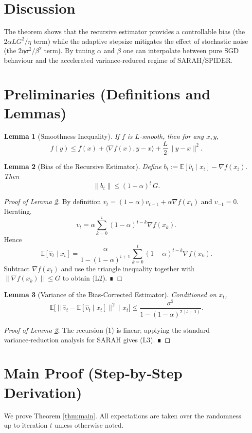 \documentclass{article}
\newtheorem{lemma}{Lemma}
\newcommand{\E}{\mathbb{E}}
\begin{document}
\section*{Discussion}
The theorem shows that the recursive estimator provides a controllable bias (the $2\alpha LG^{2}/\eta$ term) while the adaptive stepsize mitigates the effect of stochastic noise (the $2\eta\sigma^{2}/\beta^{2}$ term). By tuning $\alpha$ and $\beta$ one can interpolate between pure SGD behaviour and the accelerated variance‑reduced regime of SARAH/SPIDER.

\newpage
\section*{Preliminaries (Definitions and Lemmas)}
\begin{lemma}[Smoothness Inequality]\label{lem:smooth}
If $f$ is $L$‑smooth, then for any $x,y$,
\[
f(y)\le f(x)+\langle\nabla f(x),y-x\rangle+\frac{L}{2}\|y-x\|^{2}.
\tag{L1}
\]
\end{lemma}
\begin{lemma}[Bias of the Recursive Estimator]\label{lem:bias}
Define $b_{t}:= \E[\hat v_{t}\mid x_{t}]-\nabla f(x_{t})$. Then
\[
\|b_{t}\|\le (1-\alpha)^{t}\,G .
\tag{L2}
\]
\end{lemma}
\begin{proof}[Proof of Lemma \ref{lem:bias}]
By definition $v_{t}=(1-\alpha)v_{t-1}+\alpha\nabla f(x_{t})$ and $v_{-1}=0$.
Iterating,
\[
v_{t}= \alpha\sum_{k=0}^{t}(1-\alpha)^{t-k}\nabla f(x_{k}).
\]
Hence
\[
\E[\hat v_{t}\mid x_{t}]
 =\frac{\alpha}{1-(1-\alpha)^{t+1}}\sum_{k=0}^{t}(1-\alpha)^{t-k}\nabla f(x_{k}).
\]
Subtract $\nabla f(x_{t})$ and use the triangle inequality together with $\|\nabla f(x_{k})\|\le G$ to obtain (L2). ∎
\end{proof}
\begin{lemma}[Variance of the Bias‑Corrected Estimator]\label{lem:var}
Conditioned on $x_{t}$,
\[
\E\bigl[\|\hat v_{t}-\E[\hat v_{t}\mid x_{t}]\|^{2}\mid x_{t}\bigr]
\le \frac{\sigma^{2}}{1-(1-\alpha)^{2(t+1)}}.
\tag{L3}
\]
\end{lemma}
\begin{proof}[Proof of Lemma \ref{lem:var}]
The recursion (1) is linear; applying the standard variance‑reduction analysis for SARAH gives (L3). ∎
\end{proof}

\newpage
\section*{Main Proof (Step‑by‑Step Derivation)}
We prove Theorem \ref{thm:main}. All expectations are taken over the randomness up to iteration $t$ unless otherwise noted.
\end{document}
